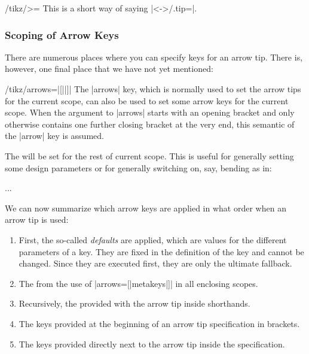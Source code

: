 \begin{key}{/tikz/>=}
  This is a short way of saying |<->/.tip=|. 
\begin{codeexample}[]
\begin{tikzpicture}[scale=2,ultra thick]
  \begin{scope}[>=Latex]
    \draw[>->]    (0pt,3ex) -- (1cm,3ex);
    \draw[|<->>|] (0pt,2ex) -- (1cm,2ex);
  \end{scope}
  \begin{scope}[>=Stealth]
    \draw[>->]    (0pt,1ex) -- (1cm,1ex);
    \draw[|<<.<->|] (0pt,0ex) -- (1cm,0ex);
  \end{scope}
\end{tikzpicture}
\end{codeexample}

\end{key}



\subsubsection{Scoping of Arrow Keys}

There are numerous places where you can specify keys for an arrow
tip. There is, however, one final place that we have not yet
mentioned:

\begin{key}{/tikz/arrows=|[||]|}
  The |arrows| key, which is normally used to set the arrow tips for
  the current scope, can also be used to set some arrow keys for the
  current scope. When the argument to |arrows| starts with an opening
  bracket and only otherwise contains one further closing bracket at
  the very end, this semantic of the |arrow| key is assumed.

  The  will be set for the rest of current
  scope. This is useful for generally setting some design parameters
  or for generally switching on, say, bending as in:
\begin{codeexample}
\tikz [arrows={[bend]}] ... %
\end{codeexample}
\end{key}

We can now summarize which arrow keys are applied in what order when
an arrow tip is used:
\begin{enumerate}
\item First, the so-called \emph{defaults} are applied, which are
  values for the different parameters of a key. They are fixed in the
  definition of the key and cannot be changed. Since they are executed
  first, they are only the ultimate fallback.
\item The  from the use of |arrows=[|meta{keys}|]| in all
  enclosing scopes.
\item Recursively, the  provided with the arrow
  tip inside shorthands.
\item The keys provided at the beginning of an arrow tip specification
  in brackets.
\item The keys provided directly next to the arrow tip inside the
  specification. 
\end{enumerate}

